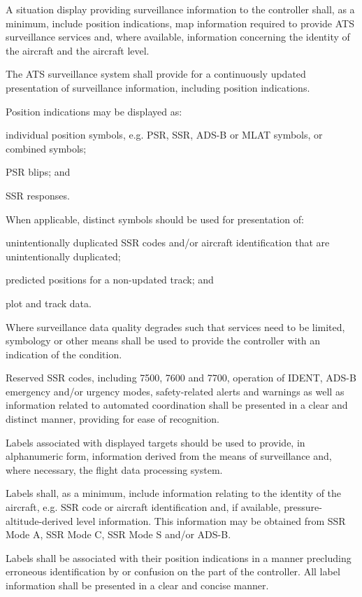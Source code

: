 \begin{enumnoss}
    \item A situation display providing surveillance information to the controller shall, as a minimum, include position indications, map information required to provide ATS surveillance services and, where available, information concerning the identity of the aircraft and the aircraft level.
    \item The ATS surveillance system shall provide for a continuously updated presentation of surveillance information, including position indications.
    \item Position indications may be displayed as:

    \begin{enumalph}
        \item individual position symbols, e.g. PSR, SSR, ADS-B or MLAT symbols, or combined symbols;
        \item PSR blips; and
        \item SSR responses.
    \end{enumalph}

    \item When applicable, distinct symbols should be used for presentation of:

    \begin{enumalph}
        \item unintentionally duplicated SSR codes and/or aircraft identification that are unintentionally duplicated;
        \item predicted positions for a non-updated track; and
        \item plot and track data.
    \end{enumalph}

    \item Where surveillance data quality degrades such that services need to be limited, symbology or other means shall be used to provide the controller with an indication of the condition.
    \item Reserved SSR codes, including 7500, 7600 and 7700, operation of IDENT, ADS-B emergency and/or urgency modes, safety-related alerts and warnings as well as information related to automated coordination shall be presented in a clear and distinct manner, providing for ease of recognition.
    \item Labels associated with displayed targets should be used to provide, in alphanumeric form, information derived from the means of surveillance and, where necessary, the flight data processing system.
    \item Labels shall, as a minimum, include information relating to the identity of the aircraft, e.g. SSR code or aircraft identification and, if available, pressure-altitude-derived level information. This information may be obtained from SSR Mode A, SSR Mode C, SSR Mode S and/or ADS-B.
    \item Labels shall be associated with their position indications in a manner precluding erroneous identification by or confusion on the part of the controller. All label information shall be presented in a clear and concise manner.
\end{enumnoss}

